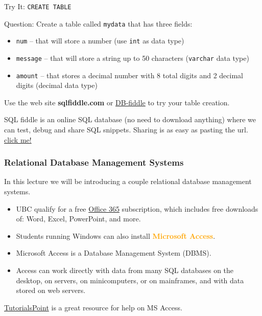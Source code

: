 \documentclass[xcolor=svgnames]{beamer}
\newcommand{\yellow}[1]{\textcolor{iyellow}{#1}}
\newcommand{\define}[1]{\textbf{\textcolor{orange}{#1}}}
\theoremstyle{example}
\newcommand{\ft}[1]{\frametitle{#1}}
\begin{document}
\begin{frame}{Try It: {\tt CREATE TABLE}}
\begin{exampleblock}{Question:} Create a table called {\tt mydata} that has three fields:
\begin{itemize}
\item {\tt num} -- that will store a number (use {\tt int} as data type)
\item {\tt message} -- that will store a string up to 50 characters ({\tt varchar} data type)
\item {\tt amount} -- that stores a decimal number with 8 total digits and 2 decimal digits (decimal data type)
\end{itemize}
Use the web site \yellow{\bf sqlfiddle.com} or \href{https://www.db-fiddle.com/}{DB-fiddle} to try your table creation.
\end{exampleblock}
SQL fiddle is an online SQL database (no need to download anything) where we can test, debug and share SQL snippets.
Sharing is as easy as pasting the url.
\href{http://sqlfiddle.com/\#!9/d8ad4/3}{click me!}
\end{frame}



\begin{frame}\ft{Relational Database Management Systems}
In this lecture we will be introducing a couple relational database management systems. 
\begin{itemize}
\item UBC qualify for a free \href{https://it.ubc.ca/services/desktop-print-services/software-licensing/office-365-students}{Office 365} subscription, which includes free downloads of: Word, Excel, PowerPoint, and more. 
\item Students running Windows can also install \define{Microsoft Access}.
\item Microsoft Access is a Database Management System (DBMS).
\item Access can work directly with data from %
many SQL databases on the desktop, on servers, on minicomputers, or on mainframes, and with data stored on web servers.
\end{itemize}
\href{https://www.tutorialspoint.com/ms_access/ms_access_overview.htm}{TutorialsPoint} is a great resource for help on MS Access.
\end{frame}
\end{document}
